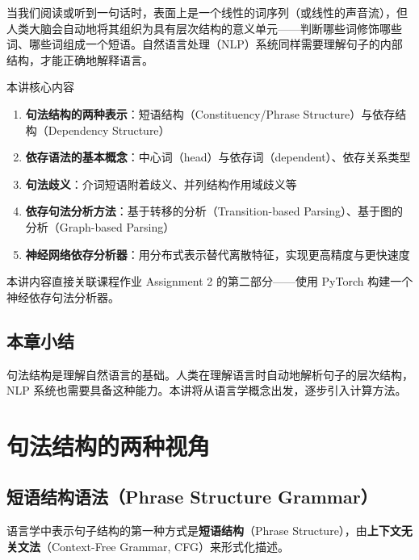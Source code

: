 \documentclass[a4paper]{article}
\begin{document}
当我们阅读或听到一句话时，表面上是一个线性的词序列（或线性的声音流），但人类大脑会自动地将其组织为具有层次结构的意义单元——判断哪些词修饰哪些词、哪些词组成一个短语。自然语言处理（NLP）系统同样需要理解句子的内部结构，才能正确地解释语言。

\begin{importantbox}{本讲核心内容}
\begin{enumerate}
    \item \textbf{句法结构的两种表示}：短语结构（Constituency/Phrase Structure）与依存结构（Dependency Structure）
    \item \textbf{依存语法的基本概念}：中心词（head）与依存词（dependent）、依存关系类型
    \item \textbf{句法歧义}：介词短语附着歧义、并列结构作用域歧义等
    \item \textbf{依存句法分析方法}：基于转移的分析（Transition-based Parsing）、基于图的分析（Graph-based Parsing）
    \item \textbf{神经网络依存分析器}：用分布式表示替代离散特征，实现更高精度与更快速度
\end{enumerate}
\end{importantbox}

本讲内容直接关联课程作业 Assignment 2 的第二部分——使用 PyTorch 构建一个神经依存句法分析器。





\subsection{本章小结}

句法结构是理解自然语言的基础。人类在理解语言时自动地解析句子的层次结构，NLP 系统也需要具备这种能力。本讲将从语言学概念出发，逐步引入计算方法。


\section{句法结构的两种视角}

\subsection{短语结构语法（Phrase Structure Grammar）}

语言学中表示句子结构的第一种方式是\textbf{短语结构}（Phrase Structure），由\textbf{上下文无关文法}（Context-Free Grammar, CFG）来形式化描述。
\end{document}
